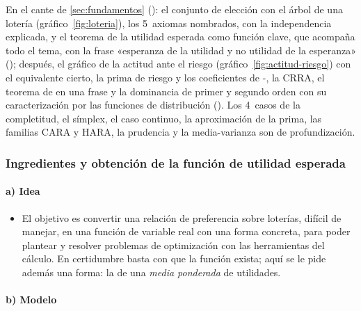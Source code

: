 \documentclass[11pt]{article}
\begin{document}
\begin{infografia}[H]
\centering
\caption{De las loterías a la decisión óptima con riesgo}\label{figu:esquema-tue}
\end{infografia}

\begin{notaopositor}
En el cante de \ref{sec:fundamentos} (): el conjunto de elección con el árbol de una lotería (gráfico~\ref{fig:loteria}), los 5~axiomas nombrados, con la independencia explicada, y el teorema de la utilidad esperada como función clave, que acompaña todo el tema, con la frase «esperanza de la utilidad y no utilidad de la esperanza» (); después, el gráfico de la actitud ante el riesgo (gráfico~\ref{fig:actitud-riesgo}) con el equivalente cierto, la prima de riesgo y los coeficientes de -, la CRRA, el teorema de  en una frase y la dominancia de primer y segundo orden con su caracterización por las funciones de distribución (). Los 4~casos de la completitud, el símplex, el caso continuo, la aproximación de la prima, las familias CARA y HARA, la prudencia y la media-varianza son de profundización.
\end{notaopositor}

\subsubsection{Ingredientes y obtención de la función de utilidad esperada}\label{sec:ingredientes}

\paragraph{a) Idea}

\begin{itemize}
\item El objetivo es convertir una relación de preferencia sobre loterías, difícil de manejar, en una función de variable real con una forma concreta, para poder plantear y resolver problemas de optimización con las herramientas del cálculo. En certidumbre basta con que la función exista; aquí se le pide además una forma: la de una \emph{media ponderada} de utilidades.
\end{itemize}

\paragraph{b) Modelo}
\end{document}
